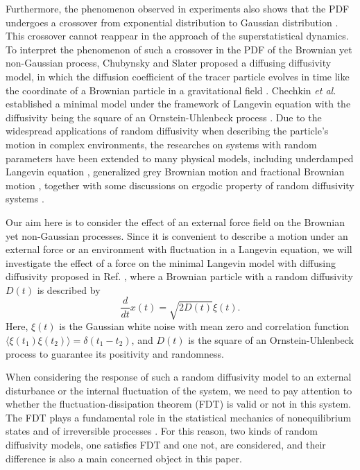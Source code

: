\documentclass[aps,pre,twocolumn,groupedaddress,longbibliography]{revtex4-2}
\begin{document}
Furthermore, the phenomenon observed in experiments also shows that the PDF undergoes a crossover from exponential distribution to Gaussian distribution \cite{WangAnthonyBaeGranick:2009,WangKuoBaeGranick:2012}. This crossover cannot reappear in the approach of the superstatistical dynamics. To interpret the phenomenon of such a crossover in the PDF of the Brownian yet non-Gaussian process, Chubynsky and Slater proposed a diffusing diffusivity model, in which the diffusion coefficient of the tracer particle evolves in time like the coordinate of a Brownian particle in a gravitational field \cite{ChubynskySlater:2014}. Chechkin {\it et al.} established a minimal model under the framework of Langevin equation with the diffusivity being the square of an Ornstein-Uhlenbeck process \cite{ChechkinSenoMetzlerSokolov:2017}. Due to the widespread applications of random diffusivity when describing the particle's motion in complex environments, the researches on systems with random parameters have been extended to many physical models, including underdamped Langevin equation \cite{SlezakMetzlerMagdziarz:2018,Vitali.etal:2018,ChenWang:2021}, generalized grey Brownian motion \cite{SposiniChechkinSenoPagniniMetzler:2018} and fractional Brownian motion \cite{JainSebastian:2018,MackalaMagdziarz:2019,Wang-etal:2020,Wang-etal:2020-2}, together with some discussions on ergodic property of random diffusivity systems \cite{CherstvyMetzler:2016,WangChen:2021,WangChen:2022}.

Our aim here is to consider the effect of an external force field on the Brownian yet non-Gaussian processes. Since it is convenient to describe a motion under an external force or an environment with fluctuation in a Langevin equation, we will investigate the effect of a force on the
minimal Langevin model with diffusing diffusivity proposed in Ref. \cite{ChechkinSenoMetzlerSokolov:2017}, where a Brownian particle with a random diffusivity $D(t)$ is described by
\begin{equation}\label{model0}
  \frac{d}{d t}x(t)=\sqrt{2D(t)}\xi(t).
\end{equation}
Here, $\xi(t)$ is the Gaussian white noise with mean zero and correlation function $\langle\xi(t_1)\xi(t_2)\rangle=\delta(t_1-t_2)$, and $D(t)$ is the square of an Ornstein-Uhlenbeck process to guarantee its positivity and randomness.

When considering the response of such a random diffusivity model to an external disturbance or the internal fluctuation of the system, we need to pay attention to whether the fluctuation-dissipation theorem (FDT) is valid or not in this system. The FDT plays a fundamental role in the statistical mechanics of nonequilibrium states and of irreversible processes \cite{Kubo:1966,MarconiPuglisiRondoniVulpiani:2008}. For this reason, two kinds of random diffusivity models, one satisfies FDT and one not, are considered, and their difference is also a main concerned object in this paper.
\end{document}
